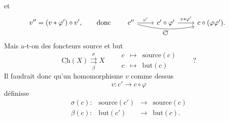 \documentclass[11pt]{article}
\newcommand{\printedpage}[1]{\marginpar{\footnotesize p.~#1}}
\newcommand{\uCh}{\underline{\mathrm{Ch}}}
\newcommand{\circled}[1]{\text{\textcircled{$\scriptstyle #1$}}}
\begin{document}
et
\[
v''=(v*\varphi')\circ v', \qquad \text{donc} \qquad
\begin{tikzcd}
c'' \arrow[r, "v'"] \arrow[rr, bend right=12, "\circled{v''}"'] & c'\circ\varphi' \arrow[r, "v*\varphi'"] & c\circ(\varphi\varphi').
\end{tikzcd}
\]
Mais a-t-on des foncteurs source et but
\[
\uCh(X) \overset{\sigma}{\underset{\beta}{\rightrightarrows}} X \qquad
\begin{array}{ccl}
c & \longmapsto & \text{source}(c)\\[1ex]
c & \longmapsto & \text{but}(c)
\end{array}
\qquad ?
\]
Il faudrait donc qu'un homomorphisme $v$ comme dessus
\[
v : c' \longrightarrow c\circ\varphi
\]
définisse
\[
\begin{array}{lrcl}
\sigma(c) : & \text{source}(c') & \longrightarrow & \text{source}(c)\\[1ex]
\beta(c) : & \text{but}(c') & \longrightarrow & \text{but}(c).
\end{array}
\]

\printedpage{19}
\end{document}
